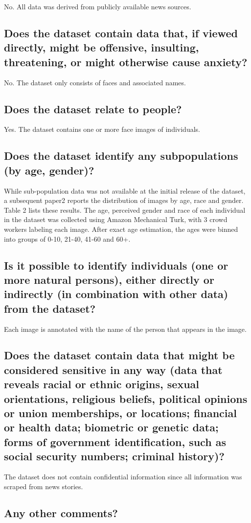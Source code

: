 \noindent No. All data was derived from publicly available news sources. 

\subsection*{Does the dataset contain data that, if viewed directly, might be offensive, insulting, threatening, or might otherwise cause anxiety?}
No. The dataset only consists of faces and associated names.

\subsection*{Does the dataset relate to people?}
\noindent Yes. The dataset contains one or more face images of individuals.


\subsection*{Does the dataset identify any subpopulations (\eg by age, gender)?}

\noindent While sub-population data was not available at the initial release of the dataset, a subsequent paper2 reports the distribution of images by age, race and gender. Table 2 lists these results. The age, perceived gender and race of each individual in the dataset was collected using Amazon Mechanical Turk, with 3 crowd workers labeling each image. After exact age estimation, the ages were binned into groups of 0-10, 21-40, 41-60 and 60+. 

\subsection*{Is it possible to identify individuals (\ie one or more natural persons), either directly or indirectly (\ie in combination with other data) from the dataset?}
\noindent Each image is annotated with the name of the person that appears
in the image.

\subsection*{Does the dataset contain data that might be considered sensitive in any way (\eg data that reveals racial or ethnic origins, sexual orientations, religious beliefs, political opinions or union memberships, or locations; financial or health data; biometric or genetic data; forms of government identification, such as social security numbers; criminal history)?}
\noindent The dataset does not contain confidential information since all information was scraped from news stories. 

\subsection*{Any other comments?}
